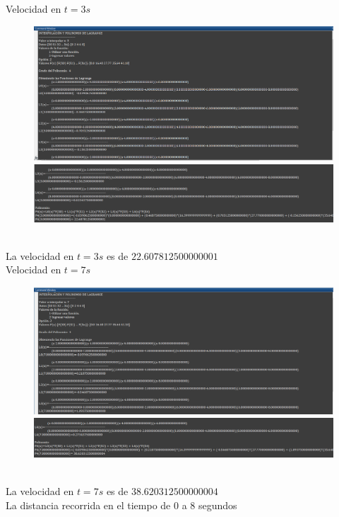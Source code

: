 \documentclass{article}
\theoremstyle{mytheoremstyle}
\theoremstyle{mytheoremstyle}
\theoremstyle{myproblemstyle}
\begin{document}
\pagebreak
\noindent \\ 
\\ Velocidad en $t=3s$
\begin{figure}[ht]
    \includegraphics[scale=0.6]{img/eje1_3.png} \\
    \includegraphics[scale=0.6]{img/eje1_4.png}
\end{figure}
\\La velocidad en $t=3s$ es de $22.607812500000001$
\pagebreak
\noindent \\Velocidad en $t=7s$
\begin{figure}[ht]
    \includegraphics[scale=0.6]{img/eje1_5.png} \\
    \includegraphics[scale=0.6]{img/eje1_6.png}
\end{figure}
\\La velocidad en $t=7s$ es de $38.620312500000004$
\noindent \\ La distancia recorrida en el tiempo de 0 a 8 segundos 
\end{document}
